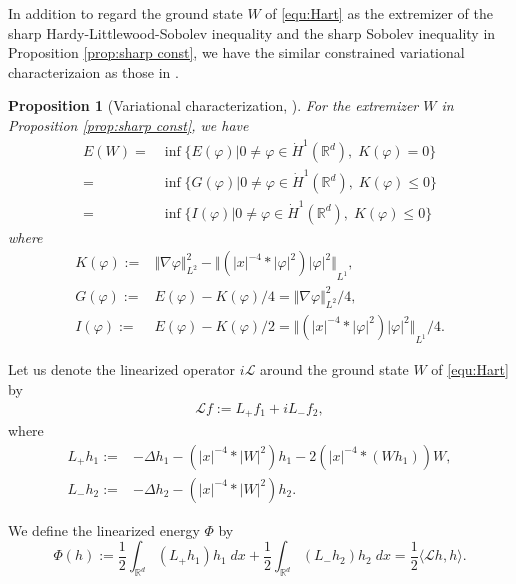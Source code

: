 \documentclass[reqno, 11pt]{amsart}
\numberwithin{equation}{section}
\newcommand{\R}{\mathbb{R}}
\theoremstyle{plain}
\newtheorem{proposition}[theorem]{Proposition}
\theoremstyle{definition}
\numberwithin{equation}{section}
\numberwithin{theorem}{section}
\numberwithin{equation}{section}
\numberwithin{equation}{section}
\numberwithin{theorem}{section}
\begin{document}
	
	In addition to regard the ground state $W$ of \eqref{equ:Hart} as the extremizer of the sharp Hardy-Littlewood-Sobolev inequality and the sharp Sobolev inequality in Proposition \ref{prop:sharp const},  we have the similar constrained variational characterizaion as those in \cite{IbrMN:NLKG, NakS:book}.  
	\begin{proposition}[Variational characterization,  \cite{IbrMN:NLKG, NakS:book}]\label{prop:GS char}For the extremizer $W$ in Proposition \ref{prop:sharp const}, we have
		\begin{equation}\label{char:Neh char}
		\begin{aligned}
		E(W)=&\inf\{E(\varphi)|0\neq\varphi \in\dot H^1(\R^d),\; K(\varphi)=0\} \\
		=&\inf\{G(\varphi)|0\neq\varphi \in\dot H^1(\R^d),\; K(\varphi)\leq0\} \\
		=&\inf\{I(\varphi)|0\neq\varphi \in\dot H^1(\R^d),\; K(\varphi)\leq0\}\ 
		\end{aligned}
		\end{equation}
		where
		\begin{equation}\label{quan:KIG}
		\begin{aligned}
		K(\varphi):=&\Vert \nabla \varphi \Vert_{L^2}^{2} -{\Vert{\left(|x|^{-4}*|\varphi|^2\right)|\varphi|^2}\Vert}_{L^1},\\
		G(\varphi):=&E(\varphi)-K(\varphi)/4=\Vert \nabla \varphi \Vert_{L^2}^{2} /4,\\
		I(\varphi):=&E(\varphi)-K(\varphi)/2={\Vert{\left(|x|^{-4}*|\varphi|^2\right)|\varphi|^2}\Vert}_{L^1}/4.
		\end{aligned}
		\end{equation}
	\end{proposition}
	
	
	Let us denote the linearized operator $i \mathcal{L}$ around the ground state $W$ of \eqref{equ:Hart} by
	\begin{align*}
	\mathcal{L}f:=L_{+}f_1+iL_{-}f_2,
	\end{align*}
	where
	\begin{equation*}
	\begin{aligned}
	L_{+}h_1:=&-\Delta h_1-\left( |x|^{-4}*|W|^2 \right)h_1-2\left( |x|^{-4}*(Wh_1) \right)W,\\
	L_{-}h_2:=&-\Delta h_2-\left( |x|^{-4}*|W|^2 \right)h_2.
	\end{aligned}
	\end{equation*}
	
	We define the linearized energy $\Phi$ by
	\begin{equation*}
	\Phi(h):=\frac12 \int_{\R^d} (L_+ h_1) h_1 \; dx + \frac12
	\int_{\R^d} (L_- h_2) h_2 \; dx =\frac12 \langle \mathcal{L} h,h \rangle.
	\end{equation*}
	
\end{document}
